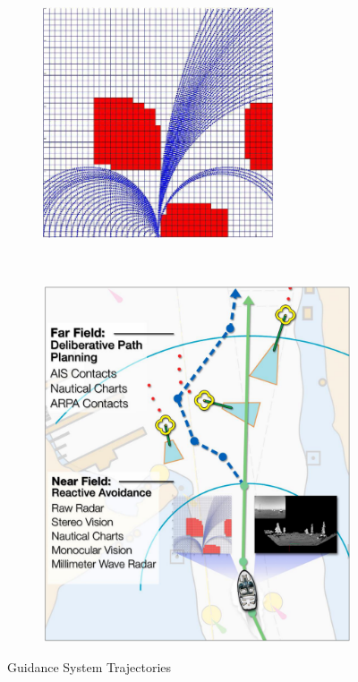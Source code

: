     \begin{figure}[t!]
    \centering
    
        \begin{subfigure}[t]{0.35\textwidth}
            \centering
            \includegraphics[width=0.75\textwidth]{figs/Larson2006Autonomous_Arcs.png}
            \label{fig:Larson2006Autonomous_Arcs}
        \end{subfigure}%
        ~ 
        \begin{subfigure}[t]{0.6\textwidth}
            \centering
            \includegraphics[width=\textwidth]{figs/Larson2006Automated_Summary.png}
            \label{fig:Larson2006Automated_Summary}
        \end{subfigure}
        
    \caption{Guidance System Trajectories \cite{Larson2006Autonomous}}
    \end{figure}
